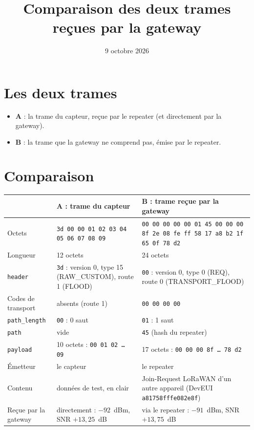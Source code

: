 \documentclass[11pt,a4paper]{article}
\title{Comparaison des deux trames reçues par la gateway}
\date{9 octobre 2026}
\begin{document}
\maketitle

\section*{Les deux trames}

\begin{itemize}
  \item \textbf{A} : la trame du capteur, reçue par le repeater (et directement par la gateway).
  \item \textbf{B} : la trame que la gateway ne comprend pas, émise par le repeater.
\end{itemize}

\section*{Comparaison}

\begin{center}
\begin{tabular}{|P{3cm}|P{5cm}|P{6.2cm}|}
\hline
 & \textbf{A : trame du capteur} & \textbf{B : trame reçue par la gateway} \\ \hline
Octets & \texttt{3d 00 00 01 02 03 04 05 06 07 08 09} & \texttt{00 00 00 00 00 01 45 00 00 00 8f 2e 08 fe ff 58 17 a8 b2 1f 65 0f 78 d2} \\ \hline
Longueur & 12 octets & 24 octets \\ \hline
\texttt{header} & \texttt{3d} : version 0, type 15 (RAW\_CUSTOM), route 1 (FLOOD) & \texttt{00} : version 0, type 0 (REQ), route 0 (TRANSPORT\_FLOOD) \\ \hline
Codes de transport & absents (route 1) & \texttt{00 00 00 00} \\ \hline
\texttt{path\_length} & \texttt{00} : 0 saut & \texttt{01} : 1 saut \\ \hline
\texttt{path} & vide & \texttt{45} (hash du repeater) \\ \hline
\texttt{payload} & 10 octets : \texttt{00 01 02 \ldots{} 09} & 17 octets : \texttt{00 00 00 8f \ldots{} 78 d2} \\ \hline
Émetteur & le capteur & le repeater \\ \hline
Contenu & données de test, en clair & Join-Request LoRaWAN d'un autre appareil (DevEUI \texttt{a81758fffe082e8f}) \\ \hline
Reçue par la gateway & directement : $-92$~dBm, SNR $+13{,}25$~dB & via le repeater : $-91$~dBm, SNR $+13{,}75$~dB \\ \hline
\end{tabular}
\end{center}
\end{document}
